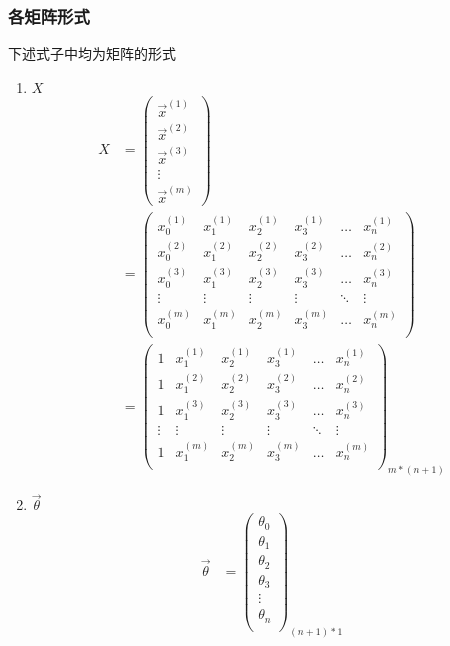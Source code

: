 \subsubsection{各矩阵形式}
下述式子中均为矩阵的形式 \\
\begin{enumerate}
\item $X$
\begin{equation} \begin{aligned}
	X & = \left(\begin{matrix}
			\vec{x}^{(1)} \\ \vec{x}^{(2)} \\ \vec{x}^{(3)} \\ \vdots \\ \vec{x}^{(m)}
		\end{matrix}\right) \\
	& = \left( \begin{matrix}
			x_0^{(1)} & x_1^{(1)} & x_2^{(1)} & x_3^{(1)} & \dots & x_n^{(1)} \\
			x_0^{(2)} & x_1^{(2)} & x_2^{(2)} & x_3^{(2)} & \dots & x_n^{(2)} \\
			x_0^{(3)} & x_1^{(3)} & x_2^{(3)} & x_3^{(3)} & \dots & x_n^{(3)} \\
			\vdots    & \vdots    & \vdots    & \vdots    & \ddots & \vdots   \\
			x_0^{(m)} & x_1^{(m)} & x_2^{(m)} & x_3^{(m)} & \dots & x_n^{(m)} \\
			\end{matrix}\right) \\
	& = \left(\begin{matrix}
			1 & x_1^{(1)} & x_2^{(1)} & x_3^{(1)} & \dots & x_n^{(1)} \\
			1 & x_1^{(2)} & x_2^{(2)} & x_3^{(2)} & \dots & x_n^{(2)} \\
			1 & x_1^{(3)} & x_2^{(3)} & x_3^{(3)} & \dots & x_n^{(3)} \\
			\vdots    & \vdots    & \vdots    & \vdots    & \ddots & \vdots   \\
			1 & x_1^{(m)} & x_2^{(m)} & x_3^{(m)} & \dots & x_n^{(m)} \\
		\end{matrix}\right)_{m*(n+1)}
\end{aligned} \end{equation}

\item $\vec{\theta}$
\begin{equation} \begin{aligned}
	\vec{\theta} & = \left(\begin{matrix}
			\theta_0 \\ \theta_1 \\ \theta_2 \\ \theta_3 \\ \vdots \\ \theta_n \\
		\end{matrix}\right)_{(n+1)*1}
\end{aligned}\end{equation}


\end{enumerate}
